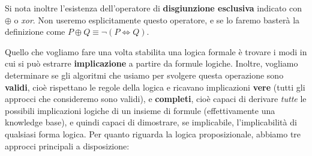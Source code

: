 \documentclass[a4paper,11pt]{article}
\begin{document}
\begin{itemize}
		Si nota inoltre l'esistenza dell'operatore di \textbf{disgiunzione esclusiva} indicato con $\oplus$ o \textit{xor}. Non useremo esplicitamente questo operatore, e se lo faremo basterà la definizione come $P \oplus Q \equiv \neg(P \Leftrightarrow Q)$.
\end{itemize}

Quello che vogliamo fare una volta stabilita una logica formale è trovare i modi in cui si può estrarre \textbf{implicazione} a partire da formule logiche.
Inoltre, vogliamo determinare se gli algoritmi che usiamo per svolgere questa operazione sono \textbf{validi}, cioè rispettano le regole della logica e ricavano implicazioni \textbf{vere} (tutti gli approcci che consideremo sono validi), e \textbf{completi}, cioè capaci di derivare \textit{tutte} le possibili implicazioni logiche di un insieme di formule (effettivamente una knowledge base), e quindi capaci di dimostrare, se implicabile, l'implicabilità di qualsiasi forma logica.
Per quanto riguarda la logica proposizionale, abbiamo tre approcci principali a disposizione:
\end{document}
